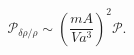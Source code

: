 \begin{equation}
  \mathcal{P}_{\delta \rho/\rho}\sim 
  \left(\frac{m A}{V a^3}\right)^2\mathcal{P}.
\end{equation}

